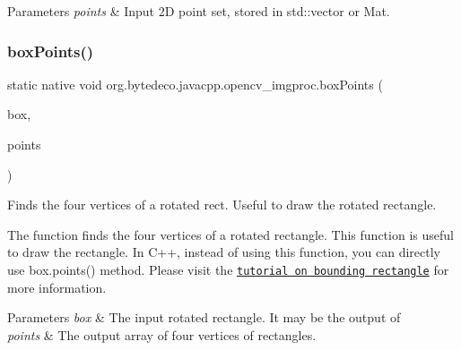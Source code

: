 \begin{DoxyParams}{Parameters}
{\em points} & Input 2D point set, stored in std\+::vector or Mat. \\
\hline
\end{DoxyParams}
\mbox{\label{group__imgproc__shape_ga02ee8d410547c387ed348bbb9c2fc213}} 
\subsubsection{\texorpdfstring{box\+Points()}{boxPoints()}}
{\footnotesize\ttfamily static native void org.\+bytedeco.\+javacpp.\+opencv\+\_\+imgproc.\+box\+Points (\begin{DoxyParamCaption}\item[{@By\+Val Rotated\+Rect}]{box,  }\item[{@By\+Val Mat}]{points }\end{DoxyParamCaption})\hspace{0.3cm}{\ttfamily [static]}}



Finds the four vertices of a rotated rect. Useful to draw the rotated rectangle. 

The function finds the four vertices of a rotated rectangle. This function is useful to draw the rectangle. In C++, instead of using this function, you can directly use box.\+points() method. Please visit the \href{http://docs.opencv.org/doc/tutorials/imgproc/shapedescriptors/bounding_rects_circles/bounding_rects_circles.html#bounding-rects-circles}{\tt tutorial on bounding rectangle} for more information. 


\begin{DoxyParams}{Parameters}
{\em box} & The input rotated rectangle. It may be the output of \\
\hline
{\em points} & The output array of four vertices of rectangles. \\
\hline
\end{DoxyParams}
\mbox{\label{group__imgproc__shape_gad3b372e7de7a736c55ae6707238019cf}} 
